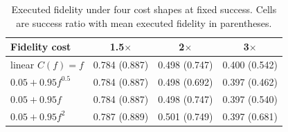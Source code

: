 \begin{table}
\centering
\footnotesize
\caption{Executed fidelity under four cost shapes at fixed success. Cells are success ratio with mean executed fidelity in parentheses.}
\label{tab:p2-gamma}
\begin{tabular}{lccc}
\toprule
Fidelity cost & 1.5$\times$ & 2$\times$ & 3$\times$ \\
\midrule
linear $C(f)=f$ & 0.784 (0.887) & 0.498 (0.747) & 0.400 (0.542) \\
$0.05+0.95f^{0.5}$ & 0.784 (0.887) & 0.498 (0.692) & 0.397 (0.462) \\
$0.05+0.95f$ & 0.784 (0.887) & 0.498 (0.747) & 0.397 (0.540) \\
$0.05+0.95f^{2}$ & 0.787 (0.889) & 0.501 (0.749) & 0.397 (0.681) \\
\bottomrule
\end{tabular}
\par\vspace{2pt}{\footnotesize\raggedright Success is flat because the ladder keeps the same deadlines; what changes is how much quality the budget buys. A linear cost is therefore not neutral: it is the most pessimistic of the four at $3\times$.\par}
\end{table}

